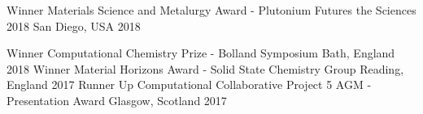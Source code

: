 \begin{cvhonors}
  \cvhonor
    {Winner}
    {Materials Science and Metalurgy Award - Plutonium Futures the Sciences 2018}
    {San Diego, USA}
    {2018}
\end{cvhonors}

\begin{cvhonors}
  \cvhonor
    {Winner}
    {Computational Chemistry Prize - Bolland Symposium}
    {Bath, England}
    {2018}
   \cvhonor
    {Winner}
    {Material Horizons Award - Solid State Chemistry Group}
    {Reading, England}
    {2017}
   \cvhonor
    {Runner Up}
    {Computational Collaborative Project 5 AGM - Presentation Award}
    {Glasgow, Scotland}
    {2017}


\end{cvhonors}
